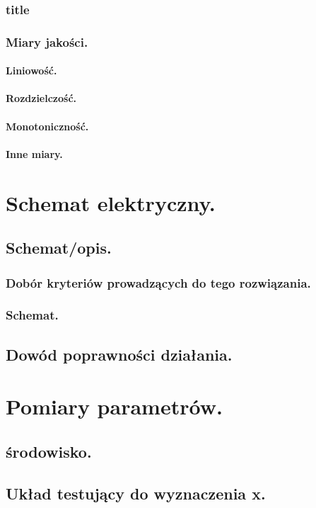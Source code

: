 \documentclass[10pt,a4paper]{report}
\begin{document}
	\subsection{title}
	\subsection{Miary jakości.}
	\subsubsection{Liniowość.}
	\subsubsection{Rozdzielczość.}
	\subsubsection{Monotoniczność.}
	\subsubsection{Inne miary.}
	
	\chapter{Schemat elektryczny.}
	\section{Schemat/opis.}
	\subsection{Dobór kryteriów prowadzących do tego rozwiązania.}
	\subsection{Schemat.}
	\section{Dowód poprawności działania.}

	\chapter{Pomiary parametrów.}
	\section{środowisko.}
	\section{Układ testujący do wyznaczenia x.}
\end{document}
